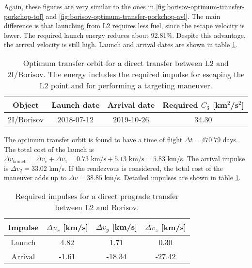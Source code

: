 Again, these figures are very similar to the ones in
\ref{fig:borisov-optimum-transfer-porkchop-tof} and
\ref{fig:borisov-optimum-transfer-porkchop-avl}. The
main difference is that launching from L2 requires less fuel, since the escape
velocity is lower. The required launch energy reduces about 92.81\%. Despite
this advantage, the arrival velocity is still high. Launch and arrival dates are
shown in table \ref{tab:l2-borisov-direct-transfer-optimum}.

\vspace{1cm}
\begin{table}[H]
  \centering
  \begin{tabular}{|c|c|c|c|}
    \hline
    Object & Launch date & Arrival date & Required $C_3$ [km$^2$/s$^2$] \\
    \hline
    2I/Borisov & 2018-07-12 & 2019-10-26 & 34.30 \\
    \hline
  \end{tabular}
  \caption[Optimum transfer orbit for a direct transfer between L2 and
        2I/Borisov.]{Optimum transfer orbit for a direct transfer between
        L2 and 2I/Borisov. The energy includes the required impulse for
        escaping the L2 point and for performing a targeting maneuver.}
  \label{tab:l2-borisov-direct-transfer-optimum}
\end{table}

The optimum transfer orbit is found to have a time of flight $\Delta t = 470.79$
days. The total cost of the launch is $\Delta v_\text{launch} = \Delta v_e +
\Delta v_1 = 0.73 \text{ km/s} + 5.13 \text{ km/s} = 5.83$ km/s. The arrival
impulse is $\Delta v_2 = 33.02$ km/s. If the rendezvous is considered, the total
cost of the maneuver adds up to $\Delta v = 38.85$ km/s. Detailed impulses are
shown in table \ref{tab:l2-borisov-direct-transfer-optimum}.

\vspace{1cm}
\begin{table}[H]
  \centering
  \begin{tabular}{|c|c|c|c|}
    \hline
    Impulse & $\Delta v_x$ [km/s] & $\Delta v_y$ [km/s] & $\Delta v_z$ [km/s] \\
    \hline
    Launch & 4.82 & 1.71 & 0.30 \\
    \hline
    Arrival & -1.61 & -18.34 & -27.42 \\
    \hline
  \end{tabular}
    \caption[Required impulses for a direct prograde transfer between L2 and
    Borisov]{Required impulses for a direct prograde transfer between L2 and
    Borisov.}
  \label{tab:l2-borisov-direct-transfer-impulses}
\end{table}
